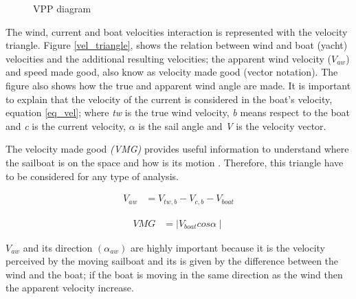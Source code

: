 \begin{figure} %
  \centering
  \hfill
  \caption{VPP diagram}
\label{vpp_diag} 
\end{figure}

The wind, current and boat velocities interaction is represented with the velocity triangle.  Figure \ref{vel_triangle}, shows the relation between wind and boat (yacht) velocities and the additional resulting velocities; the apparent wind velocity ($V_{aw}$) and speed made good,  also know as velocity made good (vector notation). The figure also shows how the true and apparent wind angle are made. It is important to explain that the velocity of the current is considered in the boat's velocity, equation \ref{eq_vel}; where \textit{tw} is the true wind velocity, \textit{b} means respect to the boat and \textit{c} is the current velocity, $\alpha$ is the sail angle and \textit{V} is the velocity vector. \par 

The velocity made good \textit{(VMG)} provides useful information to understand where the sailboat is on the space and how is its motion \cite{larsonprinciples}. Therefore, this triangle have to be considered for any type of analysis.\par 
\begin{equation}
\label{eq_vel}
\begin{aligned}
V_{aw} & = V_{tw,b} - V_{c,b} - V_{boat}
\end{aligned}
\end {equation}

\begin{equation}
\label{eq:VMG}
\begin{aligned}
VMG &=  \mid V_{boat} cos \alpha  \mid 
\end{aligned}
\end {equation}

$V_{aw}$ and its direction $( \alpha_{aw})$ are highly important because it is the velocity perceived by the moving sailboat and its is given by the difference between the wind and the boat; if the boat is moving in the same direction as the wind then the apparent velocity increase. \par 

